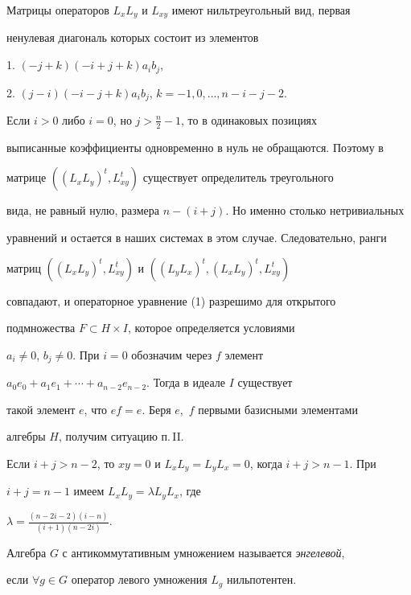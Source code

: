 Матрицы операторов $L_xL_y$ и $L_{xy}$ имеют нильтреугольный вид, первая 


ненулевая диагональ которых состоит из элементов  


 


1. $(-j+k)(-i+j+k)a_ib_j$, 


 


2. $(j-i)(-i-j+k)a_ib_j$, $k=-1,0,\dotsc,n-i-j-2$. 


 


Если $i>0$ либо $i=0$, но $j>\frac{n}{2}-1$, то в одинаковых позициях 


выписанные коэффициенты одновременно в нуль не обращаются. Поэтому в 


матрице $((L_xL_y)^t,L^t_{xy})$ существует определитель треугольного 


вида, не равный нулю, размера $n-(i+j)$. Но именно столько нетривиальных 


уравнений и остается в наших системах в этом случае. Следовательно, ранги 


матриц $((L_xL_y)^t,L^t_{xy})$ и $((L_yL_x)^t,(L_xL_y)^t,L^t_{xy})$ 


совпадают, и операторное уравнение (1) разрешимо для открытого 


подмножества $F\subset H\times I$, которое определяется условиями 


$a_i\ne0$, $b_j\ne0$. При $i=0$ обозначим через $f$ элемент 


$a_0e_0+a_1e_1+\dotsb+a_{n-2}e_{n-2}$. Тогда в идеале $I$ существует 


такой элемент $e$, что $ef=e$. Беря $e$,~$f$ первыми базисными элементами 


алгебры $H$, получим ситуацию п.\,II.  


 


Если $i+j>n-2$, то $xy=0$ и $L_xL_y=L_yL_x=0$, когда $i+j>n-1$. При 


$i+j=n-1$ имеем $L_xL_y=\lambda L_y L_x$, где 


$\lambda=\frac{(n-2i-2)(i-n)}{(i+1)(n-2i)}$.  


 


 


\begin{defn} 


Алгебра $G$ с антикоммутативным умножением называется {\it энгелевой}, 


если $\forall g\in G$ оператор левого умножения $L_g$ нильпотентен.  


\end{defn} 



